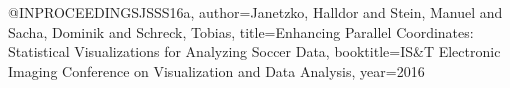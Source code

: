 @INPROCEEDINGS{JSSS16a,
author={Janetzko, Halldor and Stein, Manuel and Sacha, Dominik and Schreck, Tobias},
title={{Enhancing Parallel Coordinates: Statistical Visualizations for Analyzing Soccer Data}},
booktitle={IS&T Electronic Imaging Conference on Visualization and Data Analysis},
year={2016}
}